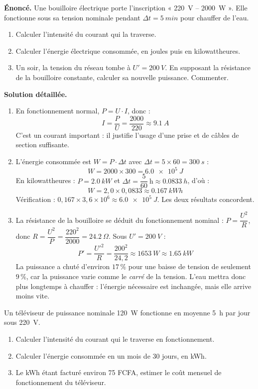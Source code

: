 \documentclass[11pt]{article}
\begin{document}
\begin{exoresolu}
\textbf{Énoncé.} Une bouilloire électrique porte l'inscription « \SI{220}{V} -- \SI{2000}{W} ». Elle fonctionne sous sa tension nominale pendant $\Delta t = \SI{5}{min}$ pour chauffer de l'eau.
\begin{enumerate}
\item Calculer l'intensité du courant qui la traverse.
\item Calculer l'énergie électrique consommée, en joules puis en kilowattheures.
\item Un soir, la tension du réseau tombe à $U' = \SI{200}{V}$. En supposant la résistance de la bouilloire constante, calculer sa nouvelle puissance. Commenter.
\end{enumerate}
\tcblower
\textbf{Solution détaillée.}
\begin{enumerate}
\item En fonctionnement normal, $P = U \cdot I$, donc :
\[ I = \frac{P}{U} = \frac{2000}{220} \approx \SI{9,1}{A} \]
C'est un courant important : il justifie l'usage d'une prise et de câbles de section suffisante.
\item L'énergie consommée est $W = P \cdot \Delta t$ avec $\Delta t = 5 \times 60 = \SI{300}{s}$ :
\[ W = 2000 \times 300 = \SI{6,0e5}{J} \]
En kilowattheures : $P = \SI{2,0}{kW}$ et $\Delta t = \dfrac{5}{60}\ \mathrm{h} \approx \SI{0,0833}{h}$, d'où :
\[ W = 2{,}0 \times 0{,}0833 \approx \SI{0,167}{kWh} \]
Vérification : $0{,}167 \times 3{,}6 \times 10^{6} \approx \SI{6,0e5}{J}$. Les deux résultats concordent.
\item La résistance de la bouilloire se déduit du fonctionnement nominal : $P = \dfrac{U^2}{R}$, donc $R = \dfrac{U^2}{P} = \dfrac{220^2}{2000} = \SI{24,2}{\Omega}$. Sous $U' = \SI{200}{V}$ :
\[ P' = \frac{U'^2}{R} = \frac{200^2}{24{,}2} \approx \SI{1653}{W} \approx \SI{1,65}{kW} \]
La puissance a chuté d'environ $17\,\%$ pour une baisse de tension de seulement $9\,\%$, car la puissance varie comme le \emph{carré} de la tension. L'eau mettra donc plus longtemps à chauffer : l'énergie nécessaire est inchangée, mais elle arrive moins vite.
\end{enumerate}
\end{exoresolu}

\begin{exercice}
Un téléviseur de puissance nominale \SI{120}{W} fonctionne en moyenne \SI{5}{h} par jour sous \SI{220}{V}.
\begin{enumerate}
\item Calculer l'intensité du courant qui le traverse en fonctionnement.
\item Calculer l'énergie consommée en un mois de 30 jours, en kWh.
\item Le kWh étant facturé environ 75 FCFA, estimer le coût mensuel de fonctionnement du téléviseur.
\end{enumerate}
\end{exercice}
\end{document}
